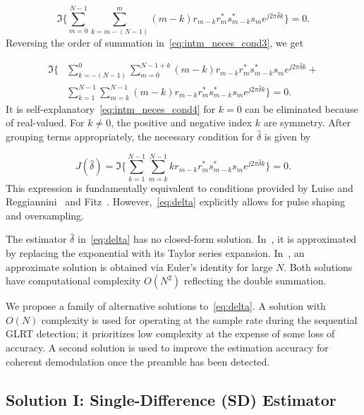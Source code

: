 \begin{equation}
    \label{eq:intm_neces_cond3}
    \Im\bigg\{\sum_{m=0}^{N-1}{\sum_{k{=}m-(N-1)}^{m}{(m{-}k)r_{m-k}r_{m}^{*}s_{m-k}^{*}s_me^{j2\pi \hat{\delta} k}}}\bigg\}=0.
  \end{equation}
Reversing the order of summation in~\eqref{eq:intm_neces_cond3}, we get

\begin{equation}
    \begin{aligned}
    \label{eq:intm_neces_cond4}
    \Im\bigg\{&\sum_{k=-(N-1)}^{0}\sum_{m=0}^{N-1+k}{(m{-}k)r_{m-k}r_{m}^{*}s_{m-k}^{*}s_me^{j2\pi\hat{\delta}k}+}\\
    &\sum_{k=1}^{N-1}\sum_{m=k}^{N-1}{(m{-}k)r_{m-k}r_{m}^{*}s_{m-k}^{*}s_me^{j2\pi\hat{\delta}k}}\bigg\}= 0.
    \end{aligned}
  \end{equation}
It is self-explanatory~\eqref{eq:intm_neces_cond4} for $k=0$ can be eliminated because of real-valued. For $k \neq 0$, the positive and negative index $k$ are symmetry. 
After grouping terms appropriately, the necessary condition for $\hat{\delta}$ is given by

\begin{equation}
    \label{eq:delta}
    J(\hat{\delta}) = \Im\bigg\{\sum_{k=1}^{N-1}{\sum_{m=k}^{N-1}{kr_{m-k}r_m^{*}s_{m-k}^{*}s_m}e^{j2\pi\hat{\delta}k}}\bigg\}=0.
    \end{equation}
This expression is fundamentally equivalent to conditions provided by Luise and Reggiannini~\cite{Luise_Reggiannini_95} and Fitz~\cite{Fitz_94}.
However,~\eqref{eq:delta} explicitly allows for pulse shaping and oversampling.

The estimator $\hat{\delta}$ in~\eqref{eq:delta} has no closed-form
solution.
In~\cite{Luise_Reggiannini_95}, it is approximated by replacing the exponential with its
Taylor series expansion.
In~\cite{Fitz_94}, an approximate solution is obtained via Euler's
identity for large $N$.
Both solutions have computational complexity $O(N^2)$ reflecting the
double summation.

We propose a family of alternative solutions to~\eqref{eq:delta}.
A solution with $O(N)$ complexity is used for operating at the sample
rate during the sequential GLRT detection;
it prioritizes low complexity at the expense of some loss of accuracy.
A second solution is used to improve the estimation accuracy for coherent demodulation once the preamble has been detected.

\subsection{Solution I: Single-Difference (SD) Estimator}

